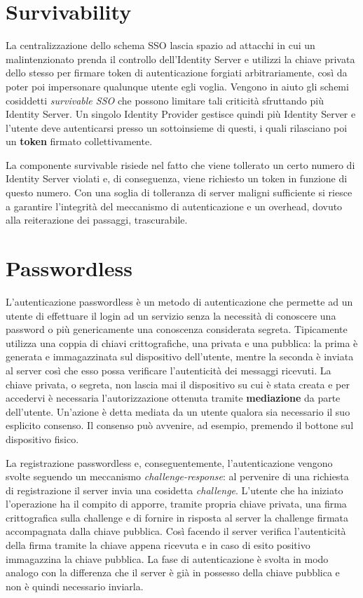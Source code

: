 \section{Survivability}
\label{surviv}

La centralizzazione dello schema SSO lascia spazio ad attacchi in cui un malintenzionato prenda il controllo dell'Identity Server e utilizzi la chiave privata dello stesso per firmare token di autenticazione forgiati arbitrariamente, così da poter poi impersonare qualunque utente egli voglia. Vengono in aiuto gli schemi cosiddetti \emph{survivable SSO} che possono limitare tali criticità sfruttando più Identity Server. Un singolo Identity Provider gestisce quindi più Identity Server e l'utente deve autenticarsi presso un sottoinsieme di questi, i quali rilasciano poi un \textbf{token} firmato collettivamente. 

La componente survivable risiede nel fatto che viene tollerato un certo numero di Identity Server violati e, di conseguenza, viene richiesto un token in funzione di questo numero. Con una soglia di tolleranza di server maligni sufficiente si riesce a garantire l'integrità del meccanismo di autenticazione e un overhead, dovuto alla reiterazione dei passaggi, trascurabile.

\section{Passwordless}
\label{passwordless}

L'autenticazione passwordless è un metodo di autenticazione che permette ad un utente di effettuare il login ad un servizio senza la necessità di conoscere una password o più genericamente una conoscenza considerata segreta. Tipicamente utilizza una coppia di chiavi crittografiche, una privata e una pubblica: la prima è generata e immagazzinata sul dispositivo dell'utente, mentre la seconda è inviata al server così che esso possa verificare l'autenticità dei messaggi ricevuti. La chiave privata, o segreta, non lascia mai il dispositivo su cui è stata creata e per accedervi è necessaria l'autorizzazione ottenuta tramite \textbf{mediazione} da parte dell'utente. Un'azione è detta mediata da un utente qualora sia necessario il suo esplicito consenso. Il consenso può avvenire, ad esempio, premendo il bottone sul dispositivo fisico.

La registrazione passwordless e, conseguentemente, l'autenticazione vengono svolte seguendo un meccanismo \emph{challenge-response}: al pervenire di una richiesta di registrazione il server invia una cosidetta \emph{challenge}. L'utente che ha iniziato l'operazione ha il compito di apporre, tramite propria chiave privata, una firma crittografica sulla challenge e di fornire in risposta al server la challenge firmata accompagnata dalla chiave pubblica. Così facendo il server verifica l'autenticità della firma tramite la chiave appena ricevuta e in caso di esito positivo immagazzina la chiave pubblica. La fase di autenticazione è svolta in modo analogo con la differenza che il server è già in possesso della chiave pubblica e non è quindi necessario inviarla.


